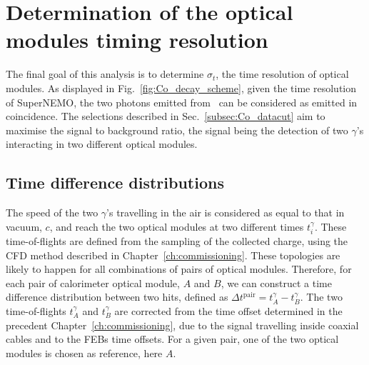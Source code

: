 









\section{Determination of the optical modules timing resolution}


The final goal of this analysis is to determine $\sigma_{t}$, the time resolution of optical modules.
As displayed in Fig.~\ref{fig:Co_decay_scheme}, given the time resolution of SuperNEMO, the two photons emitted from \Co\ can be considered as emitted in coincidence.
The selections described in Sec.~\ref{subsec:Co_datacut} aim to maximise the signal to background ratio, the signal being the detection of two $\gamma$'s interacting in two different optical modules.


\subsection{Time difference distributions}

The speed of the two $\gamma$’s travelling in the air is considered as equal to that in vacuum, $c$, and reach the two optical modules at two different times $t^{\gamma}_{i}$.
These time-of-flights are defined from the sampling of the collected charge, using the CFD method described in Chapter~\ref{ch:commissioning}.
These topologies are likely to happen for all combinations of pairs of optical modules.
Therefore, for each pair of calorimeter optical module, $A$ and $B$, we can construct a time difference distribution between two hits, defined as $\Delta t^{\text{pair}} = t^{\gamma}_{A} - t^{\gamma}_{B}$.
The two time-of-flights $t^{\gamma}_{A}$ and $t^{\gamma}_{B}$ are corrected from the time offset determined in the precedent Chapter~\ref{ch:commissioning}, due to the signal travelling inside coaxial cables and to the FEBs time offsets.
For a given pair, one of the two optical modules is chosen as reference, here $A$.

